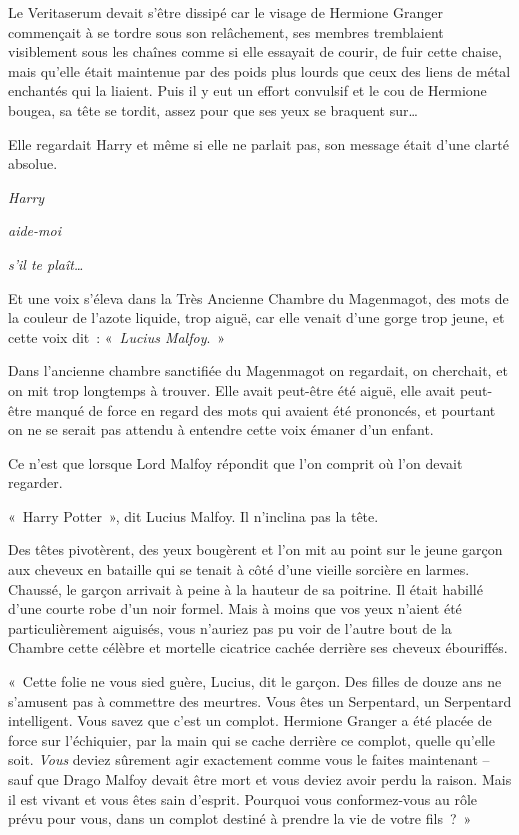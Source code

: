 Le Veritaserum devait s'être dissipé car le visage de Hermione Granger commençait à se tordre sous son relâchement, ses membres tremblaient visiblement sous les chaînes comme si elle essayait de courir, de fuir cette chaise, mais qu'elle était maintenue par des poids plus lourds que ceux des liens de métal enchantés qui la liaient.
Puis il y eut un effort convulsif et le cou de Hermione bougea, sa tête se tordit, assez pour que ses yeux se braquent sur…

Elle regardait Harry et même si elle ne parlait pas, son message était d'une clarté absolue.

\emph{Harry}

\emph{aide-moi}

\emph{s'il te plaît…}

Et une voix s'éleva dans la Très Ancienne Chambre du Magenmagot, des mots de la couleur de l'azote liquide, trop aiguë, car elle venait d'une gorge trop jeune, et cette voix dit~: «~\emph{Lucius Malfoy}.~»

\later

Dans l'ancienne chambre sanctifiée du Magenmagot on regardait, on cherchait, et on mit trop longtemps à trouver.
Elle avait peut-être été aiguë, elle avait peut-être manqué de force en regard des mots qui avaient été prononcés, et pourtant on ne se serait pas attendu à entendre cette voix émaner d'un enfant.

Ce n'est que lorsque Lord Malfoy répondit que l'on comprit où l'on devait regarder.

«~Harry Potter~», dit Lucius Malfoy.
Il n'inclina pas la tête.

Des têtes pivotèrent, des yeux bougèrent et l'on mit au point sur le jeune garçon aux cheveux en bataille qui se tenait à côté d'une vieille sorcière en larmes.
Chaussé, le garçon arrivait à peine à la hauteur de sa poitrine.
Il était habillé d'une courte robe d'un noir formel.
Mais à moins que vos yeux n'aient été particulièrement aiguisés, vous n'auriez pas pu voir de l'autre bout de la Chambre cette célèbre et mortelle cicatrice cachée derrière ses cheveux ébouriffés.

«~Cette folie ne vous sied guère, Lucius, dit le garçon.
Des filles de douze ans ne s'amusent pas à commettre des meurtres.
Vous êtes un Serpentard, un Serpentard intelligent.
Vous savez que c'est un complot.
Hermione Granger a été placée de force sur l'échiquier, par la main qui se cache derrière ce complot, quelle qu'elle soit.
\emph{Vous} deviez sûrement agir exactement comme vous le faites maintenant -- sauf que Drago Malfoy devait être mort et vous deviez avoir perdu la raison.
Mais il est vivant et vous êtes sain d'esprit.
Pourquoi vous conformez-vous au rôle prévu pour vous, dans un complot destiné à prendre la vie de votre fils~?~»

